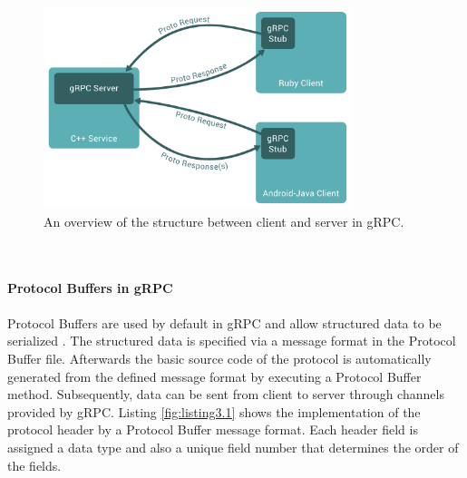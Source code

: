 \begin{figure}[tbp]
  \centering
  \includegraphics[width=0.8\textwidth]{images/grpc.png}
  \caption[gRPC Framework Structure]{An overview of the structure between client and server in gRPC.}
  \label{fig:gRPC_structure}
\end{figure}\\
\\
\textbf{Protocol Buffers in gRPC}
\\
\\
Protocol Buffers are used by default in gRPC and allow structured data to be serialized \cite{Proto}. %
The structured data is specified via a message format in the Protocol Buffer file. Afterwards the basic source code of the protocol is automatically generated from the defined message format by executing a Protocol Buffer method. Subsequently, data can be sent from client to server through channels provided by gRPC. Listing \ref{fig:listing3.1} shows the implementation of the protocol header by a Protocol Buffer message format. Each header field is assigned a data type and also a unique field number that determines the order of the fields.\\\\

